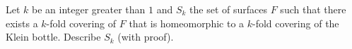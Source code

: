 Let $k$ be an integer greater than $1$ and $S_k$ the set of surfaces
$F$ such that there exists a $k$-fold covering of $F$ that is
homeomorphic to a $k$-fold covering of the Klein bottle. Describe
$S_k$ (with proof).
